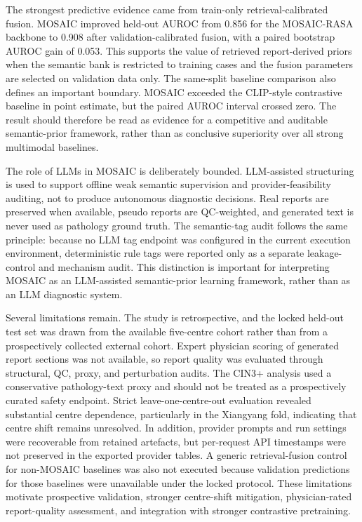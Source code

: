 \documentclass[11pt, a4paper]{article}
\theoremstyle{plain}
\theoremstyle{definition}
\begin{document}
The strongest predictive evidence came from train-only retrieval-calibrated fusion. MOSAIC improved held-out AUROC from 0.856 for the MOSAIC-RASA backbone to 0.908 after validation-calibrated fusion, with a paired bootstrap AUROC gain of 0.053. This supports the value of retrieved report-derived priors when the semantic bank is restricted to training cases and the fusion parameters are selected on validation data only. The same-split baseline comparison also defines an important boundary. MOSAIC exceeded the CLIP-style contrastive baseline in point estimate, but the paired AUROC interval crossed zero. The result should therefore be read as evidence for a competitive and auditable semantic-prior framework, rather than as conclusive superiority over all strong multimodal baselines.

The role of LLMs in MOSAIC is deliberately bounded. LLM-assisted structuring is used to support offline weak semantic supervision and provider-feasibility auditing, not to produce autonomous diagnostic decisions. Real reports are preserved when available, pseudo reports are QC-weighted, and generated text is never used as pathology ground truth. The semantic-tag audit follows the same principle: because no LLM tag endpoint was configured in the current execution environment, deterministic rule tags were reported only as a separate leakage-control and mechanism audit. This distinction is important for interpreting MOSAIC as an LLM-assisted semantic-prior learning framework, rather than as an LLM diagnostic system.

Several limitations remain. The study is retrospective, and the locked held-out test set was drawn from the available five-centre cohort rather than from a prospectively collected external cohort. Expert physician scoring of generated report sections was not available, so report quality was evaluated through structural, QC, proxy, and perturbation audits. The CIN3+ analysis used a conservative pathology-text proxy and should not be treated as a prospectively curated safety endpoint. Strict leave-one-centre-out evaluation revealed substantial centre dependence, particularly in the Xiangyang fold, indicating that centre shift remains unresolved. In addition, provider prompts and run settings were recoverable from retained artefacts, but per-request API timestamps were not preserved in the exported provider tables. A generic retrieval-fusion control for non-MOSAIC baselines was also not executed because validation predictions for those baselines were unavailable under the locked protocol. These limitations motivate prospective validation, stronger centre-shift mitigation, physician-rated report-quality assessment, and integration with stronger contrastive pretraining.
\end{document}
